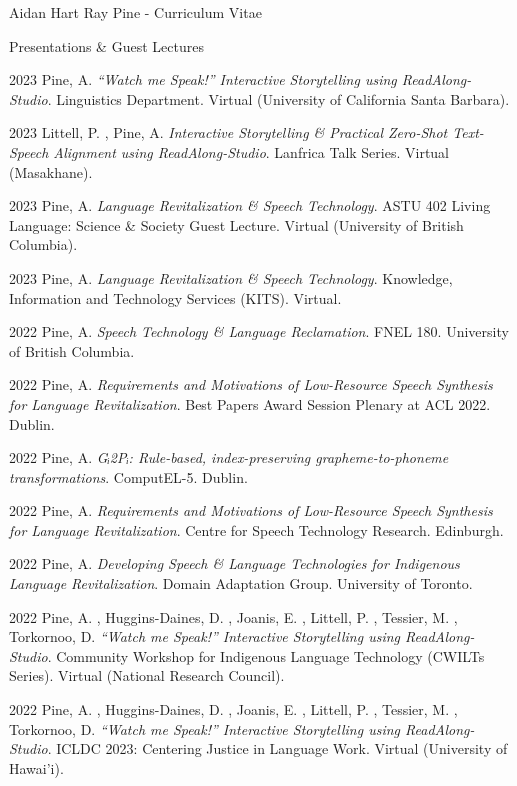 \documentclass[12pt]{letter}
\begin{document}
\begin{cv}{ Aidan Hart Ray Pine  \space - \space   Curriculum Vitae}
        \begin{cvlist}{Presentations \& Guest Lectures}
                    \item[2023]  Pine,  A.   \textit{{\textquotedblleft}Watch me Speak!{\textquotedblright} Interactive Storytelling using ReadAlong-Studio}. Linguistics Department. Virtual (University of California Santa Barbara).  
                    \item[2023]  Littell,  P. ,  Pine,  A.   \textit{Interactive Storytelling \& Practical Zero-Shot Text-Speech Alignment using ReadAlong-Studio}. Lanfrica Talk Series. Virtual (Masakhane).  
                    \item[2023]  Pine,  A.   \textit{Language Revitalization \& Speech Technology}. ASTU 402 Living Language: Science \& Society Guest Lecture. Virtual (University of British Columbia).  
                    \item[2023]  Pine,  A.   \textit{Language Revitalization \& Speech Technology}. Knowledge, Information and Technology Services (KITS). Virtual.  
                    \item[2022]  Pine,  A.   \textit{Speech Technology \& Language Reclamation}. FNEL 180. University of British Columbia.  
                    \item[2022]  Pine,  A.   \textit{Requirements and Motivations of Low-Resource Speech Synthesis for Language Revitalization}. Best Papers Award Session Plenary at ACL 2022. Dublin.  
                    \item[2022]  Pine,  A.   \textit{Gᵢ2Pᵢ: Rule-based, index-preserving grapheme-to-phoneme transformations}. ComputEL-5. Dublin.  
                    \item[2022]  Pine,  A.   \textit{Requirements and Motivations of Low-Resource Speech Synthesis for Language Revitalization}. Centre for Speech Technology Research. Edinburgh.  
                    \item[2022]  Pine,  A.   \textit{Developing Speech \& Language Technologies for Indigenous Language Revitalization}. Domain Adaptation Group. University of Toronto.  
                    \item[2022]  Pine,  A. ,  Huggins-Daines,  D. ,  Joanis,  E. ,  Littell,  P. ,  Tessier,  M. ,  Torkornoo,  D.   \textit{{\textquotedblleft}Watch me Speak!{\textquotedblright} Interactive Storytelling using ReadAlong-Studio}. Community Workshop for Indigenous Language Technology (CWILTs Series). Virtual (National Research Council).  
                    \item[2022]  Pine,  A. ,  Huggins-Daines,  D. ,  Joanis,  E. ,  Littell,  P. ,  Tessier,  M. ,  Torkornoo,  D.   \textit{{\textquotedblleft}Watch me Speak!{\textquotedblright} Interactive Storytelling using ReadAlong-Studio}. ICLDC 2023: Centering Justice in Language Work. Virtual (University of Hawai'i).  

\end{cvlist}
\end{cv}
\end{document}
